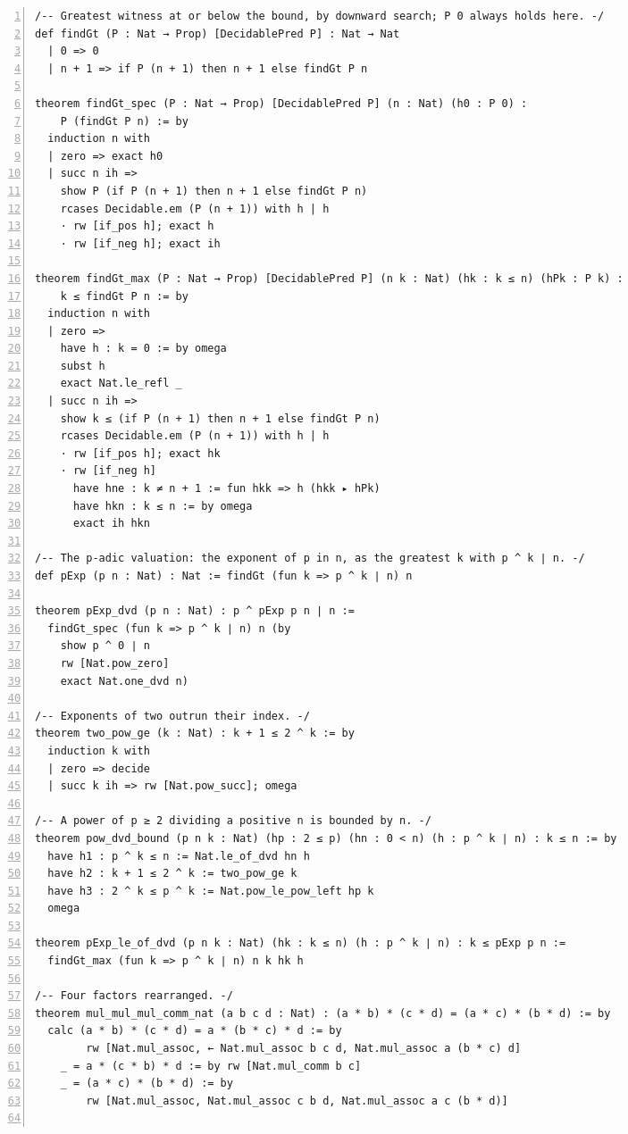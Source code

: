 \documentclass[10pt]{article}
\newcommand{\leansize}{\fontsize{5.5pt}{6.75pt}\selectfont}
\begin{document}
\begin{multicols}{2}
\begin{Verbatim}[numbers=left,firstnumber=1,numbersep=3pt,xleftmargin=2.6em,breaklines=true,breakanywhere=true,breakautoindent=false,breakindent=1.4em,breaksymbolleft={},breakanywheresymbolpre={},fontsize=\leansize]
/-- Greatest witness at or below the bound, by downward search; P 0 always holds here. -/
def findGt (P : Nat → Prop) [DecidablePred P] : Nat → Nat
  | 0 => 0
  | n + 1 => if P (n + 1) then n + 1 else findGt P n

theorem findGt_spec (P : Nat → Prop) [DecidablePred P] (n : Nat) (h0 : P 0) :
    P (findGt P n) := by
  induction n with
  | zero => exact h0
  | succ n ih =>
    show P (if P (n + 1) then n + 1 else findGt P n)
    rcases Decidable.em (P (n + 1)) with h | h
    · rw [if_pos h]; exact h
    · rw [if_neg h]; exact ih

theorem findGt_max (P : Nat → Prop) [DecidablePred P] (n k : Nat) (hk : k ≤ n) (hPk : P k) :
    k ≤ findGt P n := by
  induction n with
  | zero =>
    have h : k = 0 := by omega
    subst h
    exact Nat.le_refl _
  | succ n ih =>
    show k ≤ (if P (n + 1) then n + 1 else findGt P n)
    rcases Decidable.em (P (n + 1)) with h | h
    · rw [if_pos h]; exact hk
    · rw [if_neg h]
      have hne : k ≠ n + 1 := fun hkk => h (hkk ▸ hPk)
      have hkn : k ≤ n := by omega
      exact ih hkn

/-- The p-adic valuation: the exponent of p in n, as the greatest k with p ^ k ∣ n. -/
def pExp (p n : Nat) : Nat := findGt (fun k => p ^ k ∣ n) n

theorem pExp_dvd (p n : Nat) : p ^ pExp p n ∣ n :=
  findGt_spec (fun k => p ^ k ∣ n) n (by
    show p ^ 0 ∣ n
    rw [Nat.pow_zero]
    exact Nat.one_dvd n)

/-- Exponents of two outrun their index. -/
theorem two_pow_ge (k : Nat) : k + 1 ≤ 2 ^ k := by
  induction k with
  | zero => decide
  | succ k ih => rw [Nat.pow_succ]; omega

/-- A power of p ≥ 2 dividing a positive n is bounded by n. -/
theorem pow_dvd_bound (p n k : Nat) (hp : 2 ≤ p) (hn : 0 < n) (h : p ^ k ∣ n) : k ≤ n := by
  have h1 : p ^ k ≤ n := Nat.le_of_dvd hn h
  have h2 : k + 1 ≤ 2 ^ k := two_pow_ge k
  have h3 : 2 ^ k ≤ p ^ k := Nat.pow_le_pow_left hp k
  omega

theorem pExp_le_of_dvd (p n k : Nat) (hk : k ≤ n) (h : p ^ k ∣ n) : k ≤ pExp p n :=
  findGt_max (fun k => p ^ k ∣ n) n k hk h

/-- Four factors rearranged. -/
theorem mul_mul_mul_comm_nat (a b c d : Nat) : (a * b) * (c * d) = (a * c) * (b * d) := by
  calc (a * b) * (c * d) = a * (b * c) * d := by
        rw [Nat.mul_assoc, ← Nat.mul_assoc b c d, Nat.mul_assoc a (b * c) d]
    _ = a * (c * b) * d := by rw [Nat.mul_comm b c]
    _ = (a * c) * (b * d) := by
        rw [Nat.mul_assoc, Nat.mul_assoc c b d, Nat.mul_assoc a c (b * d)]


\end{Verbatim}
\end{multicols}
\end{document}
